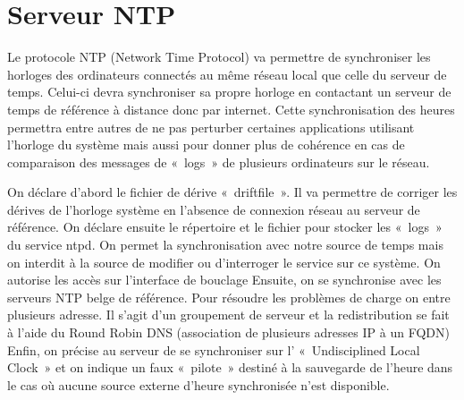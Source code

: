 \section{Serveur NTP}
Le protocole NTP (Network Time Protocol) va permettre de synchroniser les horloges des ordinateurs connectés au même réseau local que celle du serveur de temps.
Celui-ci devra synchroniser sa propre horloge en contactant un serveur de temps de référence à distance donc  par internet.
Cette synchronisation des heures permettra entre autres de ne pas perturber certaines applications utilisant l’horloge du système mais aussi pour donner plus de cohérence en cas de comparaison des messages de « logs » de plusieurs ordinateurs sur le réseau.




On déclare d’abord le fichier de dérive « driftfile ». Il va permettre de corriger les dérives de l’horloge système en l’absence de connexion réseau au serveur de référence.
On déclare ensuite le répertoire et le fichier pour stocker les « logs » du service ntpd. 
On permet la synchronisation avec notre source de temps mais on interdit à la source de modifier ou d’interroger le service sur ce système.
On autorise les accès sur l’interface de bouclage
Ensuite, on se synchronise avec les serveurs NTP belge de référence. Pour résoudre les problèmes de charge on entre plusieurs adresse. Il s’agit d’un groupement de serveur et la redistribution se fait à l’aide du Round Robin DNS (association de plusieurs adresses IP à un FQDN)
Enfin, on précise au serveur de se synchroniser sur l’ « Undisciplined Local Clock » et on indique un faux « pilote » destiné à la sauvegarde de l’heure dans le cas où aucune source externe d’heure synchronisée n’est disponible.
